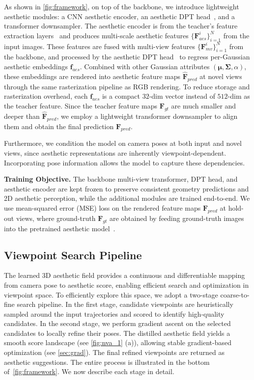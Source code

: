 As shown in \cref{fig:framework}, on top of the backbone, we introduce lightweight aesthetic modules: a CNN aesthetic encoder, an aesthetic DPT head~\cite{dpt}, and a transformer downsampler. The aesthetic encoder is from the teacher's feature extraction layers~\cite{wei2018good} and produces multi-scale aesthetic features $\{\mathbf F_{aes}^i\}_{i=1}^N$ from the input images. These features are fused with multi-view features $\{\mathbf F^i_{mv}\}_{i=1}^N$ from the backbone, and processed by the aesthetic DPT head~\cite{dpt} to regress per-Gaussian aesthetic embeddings $\mathbf f_{aes}$. Combined with other Gaussian attributes $(\boldsymbol{\mu},\boldsymbol{\Sigma},\alpha)$, these embeddings are rendered into aesthetic feature maps $\mathbf{\widehat{F}}_{pred}$ at novel views through the same rasterization pipeline as RGB rendering. To reduce storage and rasterization overhead, each $\mathbf f_{aes}$ is a compact $32$-dim vector instead of $512$-dim as the teacher feature. Since the teacher feature maps $\mathbf{F}_{gt}$ are much smaller and deeper than $\mathbf{\widehat{F}}_{pred}$, we employ a lightweight transformer downsampler to align them and obtain the final prediction $\mathbf F_{pred}$. 

Furthermore, we condition the model on camera poses at both input and novel views, since aesthetic representations are inherently viewpoint-dependent. Incorporating pose information allows the model to capture these dependencies.

\noindent\textbf{Training Objective.}
The backbone multi-view transformer, DPT head, and aesthetic encoder are kept frozen to preserve consistent geometry predictions and 2D aesthetic perception, while the additional modules are trained end-to-end. We use mean-squared error (MSE) loss on the rendered feature maps $\mathbf F_{pred}$ at hold-out views, where ground-truth $\mathbf{F}_{gt}$ are obtained by feeding ground-truth images into the pretrained aesthetic model~\cite{wei2018good}.

\subsection{Viewpoint Search Pipeline}\label{sec:search}
The learned 3D aesthetic field provides a continuous and differentiable mapping from camera pose to aesthetic score, enabling efficient search and optimization in viewpoint space.
To efficiently explore this space, we adopt a two-stage coarse-to-fine search pipeline.
In the first stage, candidate viewpoints are heuristically sampled around the input trajectories and scored to identify high-quality candidates.
In the second stage, we perform gradient ascent on the selected candidates to locally refine their poses.
The distilled aesthetic field yields a smooth score landscape (see \cref{fig:nva_1} (a)), allowing stable gradient-based optimization (see \cref{sec:grad}).
The final refined viewpoints are returned as aesthetic suggestions. The entire process is illustrated in the bottom of~\cref{fig:framework}. We now describe each stage in detail.

